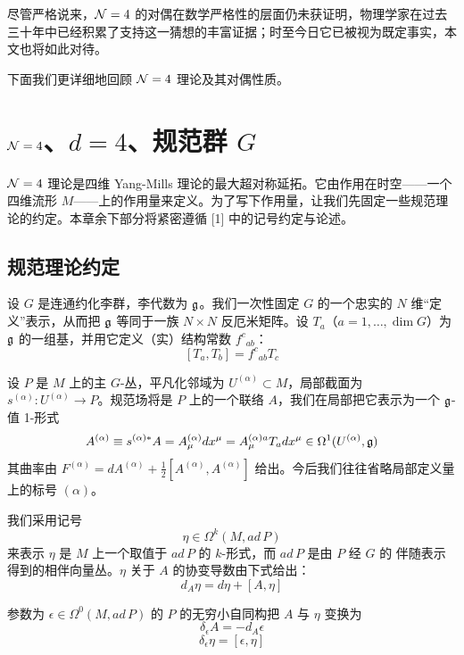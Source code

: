 尽管严格说来，$\mathcal{N}=4$ 的对偶在数学严格性的层面仍未获证明，物理学家在过去三十年中已经积累了支持这一猜想的丰富证据；时至今日它已被视为既定事实，本文也将如此对待。

下面我们更详细地回顾 $\mathcal{N}=4$ 理论及其对偶性质。

\section{\texorpdfstring{$\mathcal{N}=4$、$d=4$、规范群 $G$}{N=4、d=4、规范群 G}}

$\mathcal{N}=4$ 理论是四维 Yang-Mills 理论的最大超对称延拓。它由作用在时空——一个四维流形 $M$——上的作用量来定义。为了写下作用量，让我们先固定一些规范理论的约定。本章余下部分将紧密遵循 [1] 中的记号约定与论述。

\subsection{规范理论约定}

设 $G$ 是连通约化李群，李代数为 $\mathfrak{g}$。我们一次性固定 $G$ 的一个忠实的 $N$ 维“定义”表示，从而把 $\mathfrak{g}$ 等同于一族 $N\times N$ 反厄米矩阵。设 $T_a$（$a=1,\dots,\dim G$）为 $\mathfrak{g}$ 的一组基，并用它定义（实）结构常数 $f^{c}{}_{ab}$：
\[ [T_a,T_b] = f^{c}{}_{ab}T_c \]

设 $P$ 是 $M$ 上的主 $G$-丛，平凡化邻域为 $U^{(\alpha)}\subset M$，局部截面为 $s^{(\alpha)}:U^{(\alpha)}\to P$。规范场将是 $P$ 上的一个联络 $A$，我们在局部把它表示为一个 $\mathfrak{g}$-值 1-形式
\[ A^{(\alpha)} \equiv s^{(\alpha)*}A = A^{(\alpha)}_\mu d x^\mu = A^{(\alpha)a}_\mu T_a d x^\mu \in \Omega^1(U^{(\alpha)},\mathfrak{g}) \]
其曲率由 $F^{(\alpha)} = dA^{(\alpha)} + \frac{1}{2}[A^{(\alpha)},A^{(\alpha)}]$ 给出。今后我们往往省略局部定义量上的标号 $(\alpha)$。

我们采用记号
\[ \eta \in \Omega^k(M, ad\,P) \]
来表示 $\eta$ 是 $M$ 上一个取值于 $ad\,P$ 的 $k$-形式，而 $ad\,P$ 是由 $P$ 经 $G$ 的
伴随表示得到的相伴向量丛。$\eta$ 关于 $A$ 的协变导数由下式给出：
\[ d_A\eta = d\eta + [A,\eta] \]

参数为 $\epsilon\in\Omega^0(M,ad\,P)$ 的 $P$ 的无穷小自同构把 $A$ 与 $\eta$ 变换为
\[ \delta_\epsilon A = -d_A\epsilon \]
\[ \delta_\epsilon\eta = [\epsilon,\eta] \]


